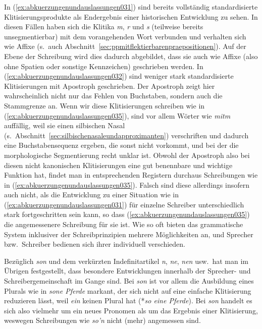 In (\ref{ex:abkuerzungenundauslassungen031}) sind bereits vollständig standardisierte Klitisierungsprodukte als Endergebnis einer historischen Entwicklung zu sehen.
In diesen Fällen haben sich die Klitika \textit{m}, \textit{r} und \textit{s} (teilweise bereits unsegmentierbar) mit dem vorangehenden Wort verbunden und verhalten sich wie Affixe (s.\ auch Abschnitt~\ref{sec:ppmitflektierbarenpraepositionen}).
Auf der Ebene der Schreibung wird dies dadurch abgebildet, dass sie auch wie Affixe (also ohne Spatien oder sonstige Kennzeichen) geschrieben werden.
In (\ref{ex:abkuerzungenundauslassungen032}) sind weniger stark standardisierte Klitisierungen mit Apostroph geschrieben.
Der Apostroph zeigt hier wahrscheinlich nicht nur das Fehlen von Buchstaben, sondern auch die Stammgrenze an.
Wenn wir diese Klitisierungen schreiben wie in (\ref{ex:abkuerzungenundauslassungen035}), sind vor allem Wörter wie \textit{mitm} auffällig, weil sie einen silbischen Nasal (s.\ Abschnitt~\ref{sec:silbischenasaleundapproximanten}) verschriften und dadurch eine Buchstabensequenz ergeben, die sonst nicht vorkommt, und bei der die morphologische Segmentierung recht unklar ist.
Obwohl der Apostroph also bei diesen nicht kanonischen Klitisierungen eine gut benennbare und wichtige Funktion hat, findet man in entsprechenden Registern durchaus Schreibungen wie in (\ref{ex:abkuerzungenundauslassungen035}).
Falsch sind diese allerdings insofern auch nicht, als die Entwicklung zu einer Situation wie in (\ref{ex:abkuerzungenundauslassungen031}) für einzelne Schreiber unterschiedlich stark fortgeschritten sein kann, so dass (\ref{ex:abkuerzungenundauslassungen035}) die angemessenere Schreibung für sie ist.
Wie so oft bieten das grammatische System inklusiver der Schreibprinzipien mehrere Möglichkeiten an, und Sprecher bzw.\ Schreiber bedienen sich ihrer individuell verschieden.

Bezüglich \textit{son} und dem verkürzten Indefinitartikel \textit{n}, \textit{ne}, \textit{nen} usw.\ hat man im Übrigen festgestellt, dass besondere Entwicklungen innerhalb der Sprecher- und Schreibergemeinschaft im Gange sind.
Bei \textit{son} ist vor allem die Ausbildung eines Plurals wie in \textit{sone Pferde} markant, der sich nicht auf eine einfache Klitisierung reduzieren lässt, weil \textit{ein} keinen Plural hat (*\textit{so eine Pferde}).
Bei \textit{son} handelt es sich also vielmehr um ein neues Pronomen als um das Ergebnis einer Klitisierung, weswegen Schreibungen wie \textit{so'n} nicht (mehr) angemessen sind.

